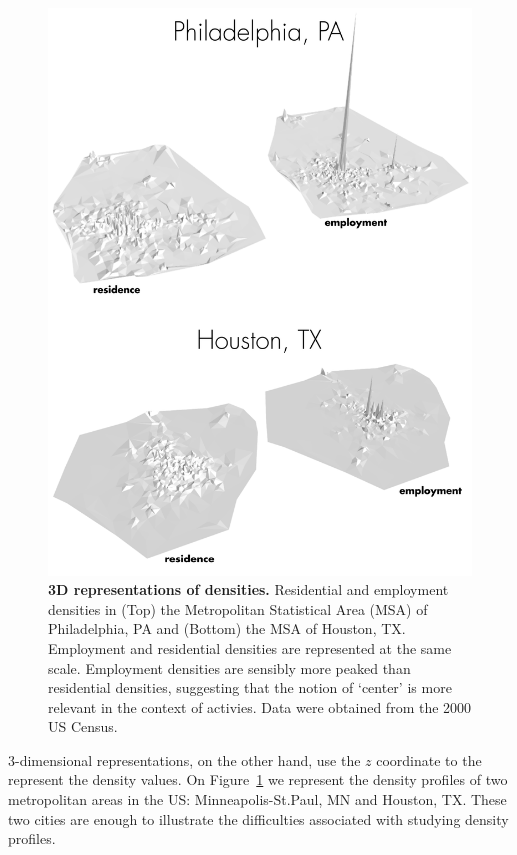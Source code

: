 \begin{figure}
    \centering
    \includegraphics[width=\textwidth]{gfx/chapter-monocentric/panel_3d.png}
    \caption{{\bf 3D representations of densities.} Residential and
        employment densities in (Top) the Metropolitan Statistical Area (MSA) of
        Philadelphia, PA and (Bottom) the MSA of Houston, TX. Employment and
        residential densities are represented at the same scale.  Employment
        densities are sensibly more peaked than residential densities,
        suggesting that the notion of `center' is more relevant in the context of
        activies. Data were obtained from the 2000 US Census.  \label{fig:density_3d}}
\end{figure}


3-dimensional representations, on the other hand, use the $z$ coordinate to the
represent the density values. On Figure~\ref{fig:density_3d} we represent the
density profiles of two metropolitan areas in the US: Minneapolis-St.Paul, MN
and Houston, TX. These two cities are enough to illustrate the difficulties associated with
studying density profiles. 

